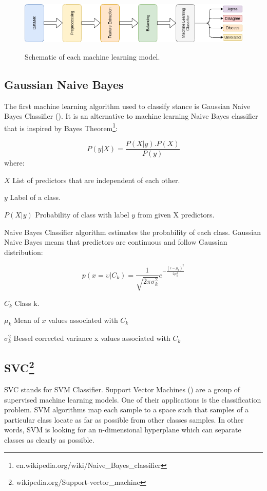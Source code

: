 \begin{figure}%
	\centering
	{\includegraphics[width=14.5cm]{statistics/schema/ml.png} }
	\caption{Schematic of each machine learning model.}%
	\label{fig:mlschm}%
\end{figure}


\subsection{Gaussian Naive Bayes}
The first machine learning algorithm used to classify stance is Gaussian Naive Bayes Classifier (\cite{GNbayes}). It is an alternative to machine learning Naive Bayes classifier that is inspired by Bayes Theorem\footnote{en.wikipedia.org/wiki/Naive\_Bayes\_classifier}:

\[ P\left(y | X\right) =   \frac{P(X|y).P(X)}{P(y)} \]
where:
\begin{eqexpl}[25mm]
	\item{$X$} List of predictors that are independent of each other.
	\item{$y$} Label of a class.
	\item{$P\left(X|y\right)$} Probability of class with label $y$ from given X predictors.
\end{eqexpl}
 Naive Bayes Classifier algorithm estimates the probability of each class. Gaussian Naive Bayes means that predictors are continuous and follow Gaussian distribution:
 
 \[p\left(x=\upsilon | C_{k}\right) = \frac{1}{\sqrt{2\pi\sigma_{k}^{2}}}e^{-\frac{\left(\epsilon-\mu_{k}\right)^{2}}{2\mu^{2}_{k}}}\]
\begin{eqexpl}[25mm]
	\item{$C_{k}$} Class k.
	\item{$\mu_{k}$} Mean of $x$ values associated with $C_{k}$
	\item{$\sigma^{2}_{k}$} Bessel corrected variance x values associated with $C_{k}$
\end{eqexpl}

\subsection{SVC\protect\footnote{wikipedia.org/Support-vector\_machine}}
\label{SVM}
SVC stands for SVM Classifier. Support Vector Machines (\cite{svc})  are a group of supervised machine learning models. One of their applications is the classification problem. SVM algorithms map each sample to a space such that samples of a particular class locate as far as possible from other classes samples. In other words, SVM is looking for an n-dimensional hyperplane which can separate classes as clearly as possible.


